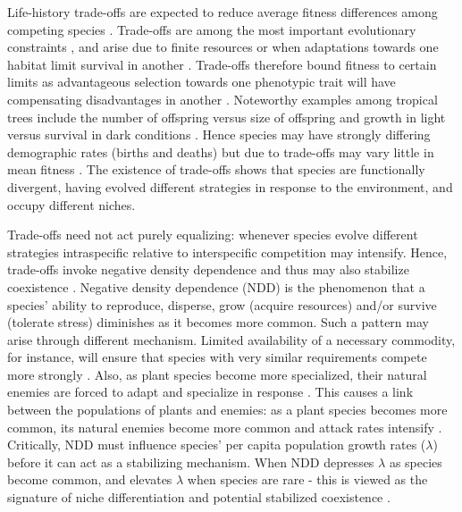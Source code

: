 \documentclass[b5paper,justified]{tufte-book} %
\begin{document}
\begin{fullwidth}
Life-history trade-offs are expected to reduce average fitness differences among competing species \citep{Chesson2000, Bell2001, Hubbell2001}. Trade-offs are among the most important evolutionary constraints \citep{Stearns1992}, and arise due to finite resources or when adaptations towards one habitat limit survival in another \citep{Fabian2012}. Trade-offs therefore bound fitness to certain limits as advantageous selection towards one phenotypic trait will have compensating disadvantages in another \citep{Stearns1989}. Noteworthy examples among tropical trees include the number of offspring versus size of offspring \citep{Muller-Landau2008} and growth in light versus survival in dark conditions \citep{Wright2010}. Hence species may have strongly differing demographic rates (births and deaths) but due to trade-offs may vary little in mean fitness \citep[e.g.][]{Ostling2012}. The existence of trade-offs shows that species are functionally divergent, having evolved different strategies in response to the environment, and occupy different niches. 

Trade-offs need not act purely equalizing: whenever species evolve different strategies intraspecific relative to interspecific competition may intensify. Hence, trade-offs invoke negative density dependence and thus may also stabilize coexistence \citep{Chesson2000}. Negative density dependence (NDD) is the phenomenon that a species' ability to reproduce, disperse, grow (acquire resources) and/or survive (tolerate stress) diminishes as it becomes more common. Such a pattern may arise through different mechanism. Limited availability of a necessary commodity, for instance, will ensure that species with very similar requirements compete more strongly \citep{Tilman1982}. Also, as plant species become more specialized, their natural enemies are forced to adapt and specialize in response \citep[e.g.][]{Coley2014}. This causes a link between the populations of plants and enemies: as a plant species becomes more common, its natural enemies become more common and attack rates intensify \citep{Gillett1962, Johnson2012}. Critically, NDD must influence species' per capita population growth rates ($\lambda$) before it can act as a stabilizing mechanism. When NDD depresses $\lambda$ as species become common, and elevates $\lambda$ when species are rare - this is viewed as the signature of niche differentiation and potential stabilized coexistence \citep{Chesson2000, Adler2007}.



\end{fullwidth}
\end{document}

